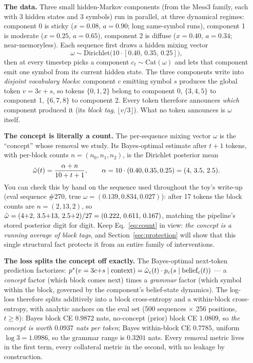 \documentclass{article}
\begin{document}
\textbf{The data.} Three small hidden-Markov components (from the Mess3 family, each with 3 hidden states and 3 symbols) run in parallel, at three dynamical regimes: component 0 is sticky ($x=0.08$, $a=0.90$; long same-symbol runs), component 1 is moderate ($x=0.25$, $a=0.65$), component 2 is diffuse ($x=0.40$, $a=0.34$; near-memoryless). Each sequence first draws a hidden mixing vector
\begin{equation*}
    \omega \sim \mathrm{Dirichlet}\big(10 \cdot [0.40,\, 0.35,\, 0.25]\big),
\end{equation*}
then at every timestep picks a component $c_t \sim \mathrm{Cat}(\omega)$ and lets that component emit one symbol from its current hidden state. The three components write into \emph{disjoint vocabulary blocks}: component $c$ emitting symbol $s$ produces the global token $v = 3c + s$, so tokens $\{0,1,2\}$ belong to component 0, $\{3,4,5\}$ to component 1, $\{6,7,8\}$ to component 2. Every token therefore announces \emph{which} component produced it (its \emph{block tag}, $\lfloor v/3\rfloor$). What no token announces is $\omega$ itself.

\textbf{The concept is literally a count.} The per-sequence mixing vector $\omega$ is the ``concept'' whose removal we study. Its Bayes-optimal estimate after $t+1$ tokens, with per-block counts $n = (n_0, n_1, n_2)$, is the Dirichlet posterior mean
\begin{equation}\label{eq:count}
    \hat{\omega}(t) = \frac{\alpha + n}{10 + t + 1}, \qquad \alpha = 10\cdot(0.40, 0.35, 0.25) = (4,\, 3.5,\, 2.5).
\end{equation}
You can check this by hand on the sequence used throughout the toy's write-up (eval sequence \#270, true $\omega = (0.139, 0.834, 0.027)$): after 17 tokens the block counts are $n = (2, 13, 2)$, so $\hat{\omega} = (4{+}2,\, 3.5{+}13,\, 2.5{+}2)/27 = (0.222,\, 0.611,\, 0.167)$, matching the pipeline's stored posterior digit for digit. Keep Eq.~\eqref{eq:count} in view: \emph{the concept is a running average of block tags}, and Section~\ref{sec:protection} will show that this single structural fact protects it from an entire family of interventions.

\textbf{The loss splits the concept off exactly.} The Bayes-optimal next-token prediction factorizes: $p^*(v = 3c{+}s \mid \text{context}) = \hat{\omega}_c(t)\cdot p_c(s \mid \text{belief}_c(t))$ --- a \emph{concept} factor (which block comes next) times a \emph{grammar} factor (which symbol within the block, governed by the component's belief-state dynamics). The log-loss therefore splits additively into a block cross-entropy and a within-block cross-entropy, with analytic anchors on the eval set (500 sequences $\times$ 256 positions, $t \ge 8$): Bayes block CE $0.9872$ nats, no-concept (prior) block CE $1.0809$, so \emph{the concept is worth $0.0937$ nats per token}; Bayes within-block CE $0.7785$, uniform $\log 3 = 1.0986$, so the grammar range is $0.3201$ nats. Every removal metric lives in the first term, every collateral metric in the second, with no leakage by construction.
\end{document}
